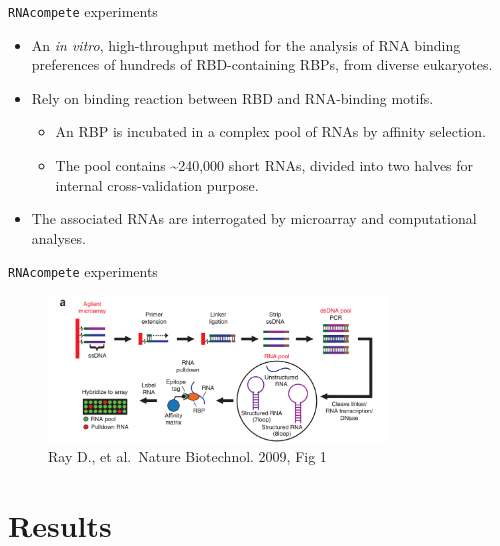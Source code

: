 \documentclass[professionalfont, 12pt, default]{beamer}
\providecommand{\tightlist}{%
    \setlength{\itemsep}{0pt}\setlength{\parskip}{0pt}}
\begin{document}
\begin{frame}{%
\protect\hypertarget{rnacompete-experiments}{%
\texttt{RNAcompete} experiments}}

\begin{itemize}
\tightlist
\item
  An \emph{in vitro}, high-throughput method for the analysis of RNA
  binding preferences of hundreds of RBD-containing RBPs, from diverse
  eukaryotes.
\item
  Rely on binding reaction between RBD and RNA-binding motifs.

  \begin{itemize}
  \tightlist
  \item
    An RBP is incubated in a complex pool of RNAs by affinity selection.
  \item
    The pool contains \textasciitilde{}240,000 short RNAs, divided into
    two halves for internal cross-validation purpose.
  \end{itemize}
\item
  The associated RNAs are interrogated by microarray and computational
  analyses.
\end{itemize}

\end{frame}

\begin{frame}{%
\protect\hypertarget{rnacompete-experiments-1}{%
\texttt{RNAcompete} experiments}}

\begin{figure}
\centering
\includegraphics[width=0.8\textwidth,height=\textheight]{img/RNAcompete.png}
\caption{Ray D., et al.~Nature Biotechnol. 2009, Fig 1}
\end{figure}

\end{frame}

\hypertarget{results}{%
\section{Results}\label{results}}
\end{document}
